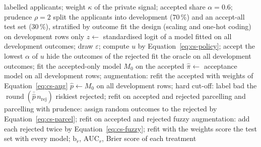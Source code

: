 \begin{algorithm}[htbp]
\caption{One repetition of the reject-inference experiment on a labelled population}
\label{alg:cs-reject}
\begin{algorithmic}[1]
\Require labelled applicants; weight $\kappa$ of the private signal; accepted share $\alpha=0.6$; prudence $\rho=2$
\State split the applicants into development ($70\,\%$) and an accept-all test set ($30\,\%$), stratified by outcome
\State fit the design (scaling and one-hot coding) on development rows only
\State $z\gets$ standardised logit of a model fitted on all development outcomes; draw $\varepsilon$; compute $u$ by Equation~\eqref{eq:cs-policy}; accept the lowest $\alpha$ of $u$
\State hide the outcomes of the rejected
\State fit the oracle on all development outcomes; fit the accepted-only model $M_0$ on the accepted
\State $\hat\pi\gets$ acceptance model on all development rows; augmentation: refit the accepted with weights of Equation~\eqref{eq:cs-aug}
\State $\hat p\gets M_0$ on all development rows; hard cut-off: label bad the $\operatorname{round}(\bar{\hat p}\,n_{\mathrm{rej}})$ riskiest rejected; refit on accepted and rejected
\State parcelling and parcelling with prudence: assign random outcomes to the rejected by Equation~\eqref{eq:cs-parcel}; refit on accepted and rejected
\State fuzzy augmentation: add each rejected twice by Equation~\eqref{eq:cs-fuzzy}; refit with the weights
\State score the test set with every model; \Return $\mathrm b_r$, $\mathrm{AUC}_r$, Brier score of each treatment
\end{algorithmic}
\end{algorithm}

